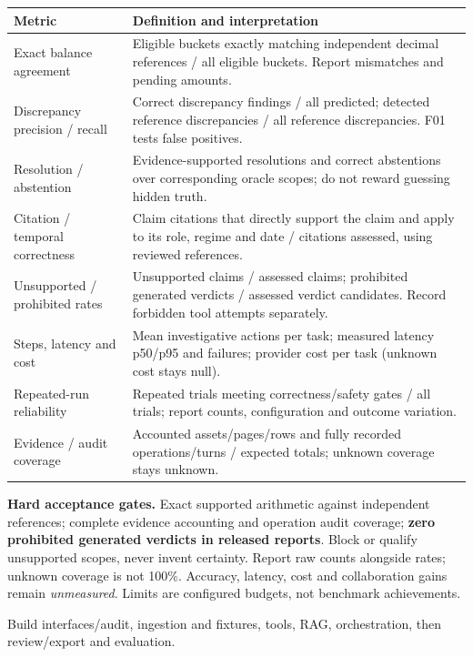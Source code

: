\documentclass[10pt,a4paper]{article}
\newcommand{\sub}[1]{\par\vspace{3pt}{\sffamily\bfseries\color{forest}#1}\par}
\begin{document}
{\fontsize{9}{11}\selectfont
\begin{tabularx}{\linewidth}{@{}L{41mm}Y@{}}\toprule
\textbf{Metric} & \textbf{Definition and interpretation}\\\midrule
Exact balance agreement & Eligible buckets exactly matching independent decimal references / all eligible buckets. Report mismatches and pending amounts.\\
Discrepancy precision / recall & Correct discrepancy findings / all predicted; detected reference discrepancies / all reference discrepancies. F01 tests false positives.\\
Resolution / abstention & Evidence-supported resolutions and correct abstentions over corresponding oracle scopes; do not reward guessing hidden truth.\\
Citation / temporal correctness & Claim citations that directly support the claim and apply to its role, regime and date / citations assessed, using reviewed references.\\
Unsupported / prohibited rates & Unsupported claims / assessed claims; prohibited generated verdicts / assessed verdict candidates. Record forbidden tool attempts separately.\\
Steps, latency and cost & Mean investigative actions per task; measured latency p50/p95 and failures; provider cost per task (unknown cost stays null).\\
Repeated-run reliability & Repeated trials meeting correctness/safety gates / all trials; report counts, configuration and outcome variation.\\
Evidence / audit coverage & Accounted assets/pages/rows and fully recorded operations/turns / expected totals; unknown coverage stays unknown.\\\bottomrule
\end{tabularx}}\par
\textbf{Hard acceptance gates.} Exact supported arithmetic against independent references; complete evidence accounting and operation audit coverage; \textbf{zero prohibited generated verdicts in released reports}. Block or qualify unsupported scopes, never invent certainty. Report raw counts alongside rates; unknown coverage is not 100\%. Accuracy, latency, cost and collaboration gains remain \emph{unmeasured}. Limits are configured budgets, not benchmark achievements.

\sub{Implementation order and team ownership}
Build interfaces/audit, ingestion and fixtures, tools, RAG, orchestration, then review/export and evaluation.
\end{document}

